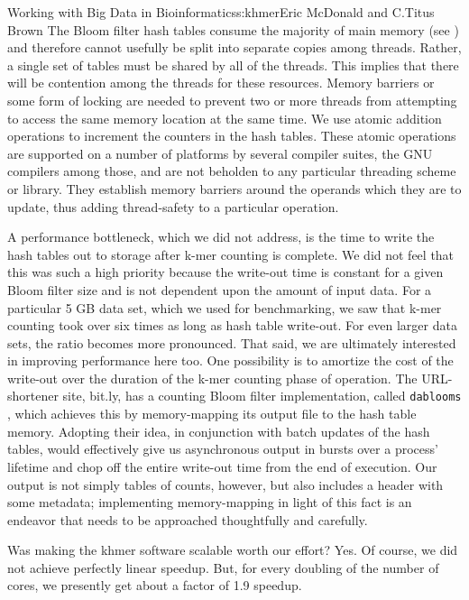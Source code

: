 \begin{aosachapter}{Working with Big Data in Bioinformatics}{s:khmer}{Eric McDonald and C.\/Titus Brown}
The Bloom filter hash tables consume the majority of main memory (see
) and therefore cannot usefully be split
into separate copies among threads. Rather, a single set of tables must
be shared by all of the threads. This implies that there will be
contention among the threads for these resources. Memory barriers
\cite{web:membar} or some form of locking are needed to prevent two or
more threads from attempting to access the same memory location at the
same time. We use atomic addition operations to increment the counters
in the hash tables. These atomic operations \cite{web:atomics} are
supported on a number of platforms by several compiler suites, the GNU
compilers among those, and are not beholden to any particular threading
scheme or library. They establish memory barriers around the operands
which they are to update, thus adding thread-safety to a particular
operation.

A performance bottleneck, which we did not address, is the time to write
the hash tables out to storage after k-mer counting is complete. We did
not feel that this was such a high priority because the write-out time
is constant for a given Bloom filter size and is not dependent upon the
amount of input data. For a particular 5 GB data set, which we used for
benchmarking, we saw that k-mer counting took over six times as long as
hash table write-out. For even larger data sets, the ratio becomes more
pronounced. That said, we are ultimately interested in improving
performance here too. One possibility is to amortize the cost of the
write-out over the duration of the k-mer counting phase of operation.
The URL-shortener site, bit.ly, has a counting Bloom filter
implementation, called \texttt{dablooms} \cite{web:dablooms}, which
achieves this by memory-mapping its output file to the hash table
memory. Adopting their idea, in conjunction with batch updates of the
hash tables, would effectively give us asynchronous output in bursts
over a process' lifetime and chop off the entire write-out time from the
end of execution. Our output is not simply tables of counts, however,
but also includes a header with some metadata; implementing
memory-mapping in light of this fact is an endeavor that needs to be
approached thoughtfully and carefully.


Was making the khmer software scalable worth our effort? Yes. Of course,
we did not achieve perfectly linear speedup. But, for every doubling of
the number of cores, we presently get about a factor of 1.9 speedup.


\end{aosachapter}
